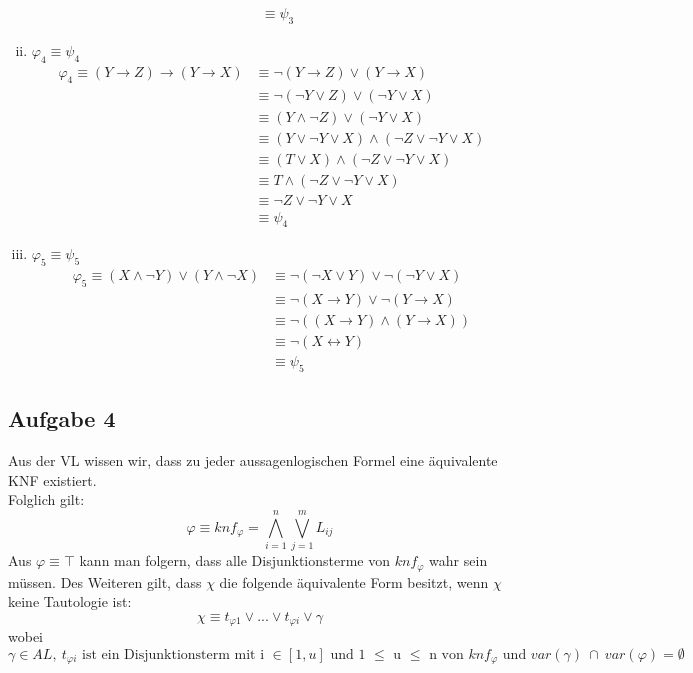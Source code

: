 \documentclass[a4paper,10pt]{article}
\begin{document}
\begin{enumerate}[(i)]
\begin{align*}
	&\equiv \psi_3 
	\end{align*}
\item $\varphi_4 \equiv \psi_4$
	\begin{align*}
	\varphi_4 \equiv (Y \rightarrow Z) \rightarrow (Y \rightarrow X) 
	&\equiv \neg (Y \rightarrow Z) \vee (Y \rightarrow X) \\
	&\equiv \neg (\neg Y \vee Z) \vee (\neg Y \vee X) \\
	&\equiv (Y \wedge \neg Z) \vee (\neg Y \vee X) \\
	&\equiv (Y \vee \neg Y \vee X) \wedge (\neg Z \vee \neg Y \vee X)\\
	&\equiv (T \vee X) \wedge (\neg Z \vee \neg Y \vee X)\\
	&\equiv T \wedge (\neg Z \vee \neg Y \vee X)\\
	&\equiv \neg Z \vee \neg Y \vee X\\
	&\equiv \psi_4 
	\end{align*}
\item $\varphi_5 \equiv \psi_5$
	\begin{align*}
	\varphi_5 \equiv (X \wedge\neg Y) \vee (Y \wedge \neg X) 
	&\equiv \neg (\neg X \vee Y) \vee \neg (\neg Y \vee X) \\
	&\equiv \neg (X \rightarrow Y) \vee \neg (Y \rightarrow X) \\
	&\equiv \neg ((X \rightarrow Y) \wedge (Y \rightarrow X)) \\
	&\equiv \neg (X \leftrightarrow Y) \\
	&\equiv \psi_5 
	\end{align*}
\end{enumerate}
	\newpage
	\subsection*{Aufgabe 4}
	Aus der VL wissen wir, dass zu jeder aussagenlogischen Formel eine äquivalente KNF existiert. \\
	Folglich gilt: $$\varphi \equiv knf_{\varphi} = \bigwedge\limits_{i=1}^{n} \bigvee\limits_{j=1}^{m} L_{ij}$$ 
	Aus $\varphi \equiv \top$ kann man folgern, dass alle Disjunktionsterme von $knf_{\varphi}$ wahr sein müssen. Des Weiteren gilt, dass $\chi$ die folgende äquivalente Form besitzt, wenn $\chi$ keine Tautologie ist:
	$$ \chi \equiv t_{\varphi 1} \vee ... \vee  t_{\varphi i} \vee \gamma$$ 
	wobei
	$\gamma \in AL,~t_{\varphi i} \text{ ist ein Disjunktionsterm
	mit i $\in [1,u]$ und 1 $\leq$ u $\leq$ n von } 
	knf_{\varphi} \text{ und } var(\gamma) ~\cap~ var(\varphi) = \emptyset $
	\\
	
\end{document}
